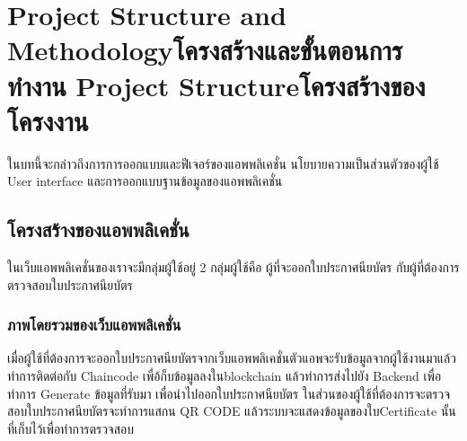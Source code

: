 \chapter{\ifproject%
\ifenglish Project Structure and Methodology\else โครงสร้างและขั้นตอนการทำงาน\fi
\else%
\ifenglish Project Structure\else โครงสร้างของโครงงาน\fi
\fi
}

\enskip \enskip \enskip \enskip \enskip ในบทนี้จะกล่าวถึงการการออกแบบและฟีเจอร์ของแอพพลิเคชั่น นโยบายความเป็นส่วนตัวของผู้ใช้ User interface และการออกแบบฐานข้อมูลของแอพพลิเคชั่น



\makeatletter


\makeatother

\section{โครงสร้างของแอพพลิเคชั่น}
\enskip \enskip \enskip \enskip \enskip 
ในเว็บแอพพลิเคชั่นของเราจะมีกลุ่มผู้ใช้อยู่ 2 กลุ่มผู้ใช้คือ ผู้ที่จะออกใบประกาศนียบัตร กับผู้ที่ต้องการตรวจสอบใบประกาศนียบัตร
\subsection{ภาพโดยรวมของเว็บแอพพลิเคชั่น}
\enskip \enskip \enskip \enskip \enskip 
เมื่อผู้ใช้ที่ต้องการจะออกใบประกาศนียบัตรจากเว็บแอพพลิเคชั่นตัวแอพจะรับข้อมูลจากผู้ใช้งานมาแล้วทำการติดต่อกับ
Chaincode  เพื่อ้ก็บข้อมูลลงในblockchain แล้วทำการส่งไปยัง Backend เพื่อทำการ Generate ข้อมูลที่รับมา เพื่อนำไปออกใบประกาศนียบัตร 
ในส่วนของผู้ใช้ที่ต้องการจะตรวจสอบใบประกาศนียบัตรจะทำการแสกน QR CODE แล้วระบบจะแสดงข้อมูลของใบCertificate นั้นที่เก็บไว้เพื่อทำการตรวจสอบ



